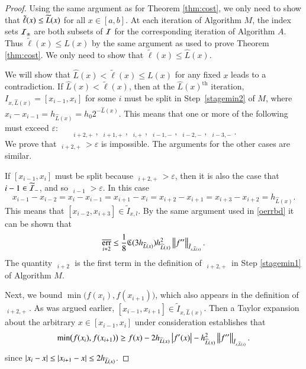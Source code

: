 \documentclass[review]{elsarticle}
\newcommand{\abstol}{\varepsilon}
\theoremstyle{definition}
\newcommand{\tell}{\tilde{\ell}}
\newcommand{\chL}{\widehat{L}}
\DeclareMathOperator{\oerr}{\overline{err}}
\DeclareMathOperator{\herr}{\widehat{err}}
\begin{document}
\begin{proof}

Using the same argument as for Theorem \ref{thm:cost}, we only need to show that
$\tell(x) \le \tL(x)$ for all $x \in [a,b]$.  At each iteration of Algorithm $M$, the index sets
$\mathcal{I}_{\pm}$ are both subsets of $\mathcal{I}$ for the corresponding iteration of Algorithm $A$.
Thus $\tell(x)
\le L(x)$ by the same argument as used to prove Theorem \ref{thm:cost}.  We
only need to show that $\tell(x) \le \chL(x)$.
	
We will show that $\chL(x) < \tell(x) \le L(x)$ for any fixed $x$  leads to a contradiction.
If $\chL(x) < \tell(x)$, then at the $\chL(x)^{\text{th}}$  iteration,
$I_{x,\chL(x)} = [x_{i-1},x_i]$ for some $i$ must be split in Step~\ref{stagemin2} of $M$,
where $x_i-x_{i-1}= h_{\chL(x)} = h_0 2^{-\chL(x)}$.  This means that one or more of the
following must exceed $\abstol$:
\[
\herr_{i+2,+} , \ \herr_{i+1,+}, \ \herr_{i,+}, \  \herr_{i-1,-}, \ \herr_{i-2,-}, \ \herr_{i-3,-}.
\]
We prove that $\herr_{i+2,+} > \abstol$ is impossible.  The arguments for the other cases
are similar.

If $[x_{i-1},x_i]$ must be split because $\herr_{i+2,+} > \abstol$, then it is also the case
that $i-1 \in \widetilde{\mathcal{I}}_-$, and so $\oerr_{i-1} > \abstol$.  In this case
\[
x_{i-1} - x_{i-2} = x_i - x_{i-1} = x_{i+1} - x_i = x_{i+2} - x_{i+1}  = x_{i+3} - x_{i+2}
= h_{\chL(x)}.
\]
This means that $[x_{i-2},x_{i+3}] \in \tilde{I}_{x,l}$. By the same argument used in
\eqref{oerrbd} it can be shown that
\begin{equation}
\oerr_{i+2} \le \frac{1}{8} \fC(3 h_{\chL(x)}) h_{\chL(x)}^2 \norm[\tilde{I}_{x,\chL(x)}]{f''}.
\label{oerrupbd}
\end{equation}
The quantity $\oerr_{i+2}$ is the first term in the definition of $\herr_{i+2,+}$ in Step
\ref{stagemin1} of Algorithm $M$.

Next, we bound $\min\bigl(f(x_{i}),f(x_{i+1}) \bigr)$, which also appears in the
definition of $\herr_{i+2,+}$. As was argued earlier, $[x_{i-1},x_{i+1}] \in
\tilde{I}_{x,\chL(x)}$. Then a Taylor expansion about the arbitrary $x \in [x_{i-1},x_{i}] $
under consideration establishes that
\begin{equation} \label{minfjjm1bd}
\min\bigl(f(x_{i}),f(x_{i+1}) \bigr)
\ge f(x) - 2h_{\chL(x)}\abs{f'(x)} - h_{\chL(x)}^2 \norm[\bar{I}_{x,\chL(x)}]{f''} .
\end{equation}
since $\abs{x_i - x} \le \abs{x_{i+1} - x} \le 2h_{\chL(x)}$.


\end{proof}
\end{document}
